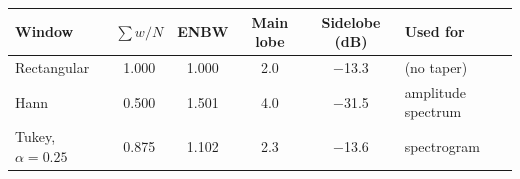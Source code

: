 \setlength{\tabcolsep}{4pt}\begin{tabular}{@{}lccccl@{}}
\toprule
Window & $\sum w / N$ & ENBW & Main lobe & Sidelobe (dB) & Used for \\ \midrule
Rectangular & 1.000 & 1.000 & 2.0 & −13.3 & (no taper) \\
Hann & 0.500 & 1.501 & 4.0 & −31.5 & amplitude spectrum \\
Tukey, $\alpha = 0.25$ & 0.875 & 1.102 & 2.3 & −13.6 & spectrogram \\
\bottomrule
\end{tabular}
